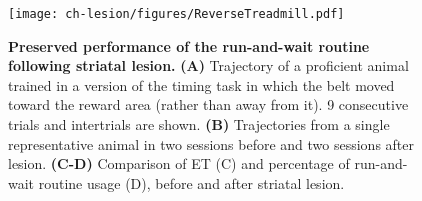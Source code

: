\begin{figure}[bth!]
 \begin{center}
	\texttt{[image: ch-lesion/figures/ReverseTreadmill.pdf]}
	\caption[Preserved Motor Routine Performance After Lesion]
	{\textbf{Preserved performance of the run-and-wait routine following striatal lesion.}
	\textbf{(A)} Trajectory of a proficient animal trained in a version of the timing task in which the belt moved toward the reward area (rather than away from it). 9 consecutive trials and intertrials are shown.
	\textbf{(B)} Trajectories from a single representative animal in two sessions before and two sessions after lesion.
	\textbf{(C-D)} Comparison of ET (C) and percentage of run-and-wait routine usage (D), before and after striatal lesion.
	}
	\label{fig:lesion:rev}
 \end{center}
\end{figure}